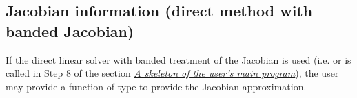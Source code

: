 \documentclass[letterpaper,10pt,english]{sphinxmanual}
\begin{document}
\subsection{Jacobian information (direct method with banded Jacobian)}
\label{c_interface/User_supplied:cinterface-bandjacobianfn}\label{c_interface/User_supplied:jacobian-information-direct-method-with-banded-jacobian}
If the direct linear solver with banded treatment of the Jacobian is
used (i.e. {\hyperref[c_interface/User_callable:ARKBand]{}} or {\hyperref[c_interface/User_callable:ARKLapackBand]{}} is called
in Step 8 of the section {\hyperref[c_interface/Skeleton:cinterface-skeleton]{\emph{A skeleton of the user's main program}}}), the user may
provide a function of type {\hyperref[c_interface/User_supplied:ARKDlsBandJacFn]{}} to provide the
Jacobian approximation.
\end{document}
